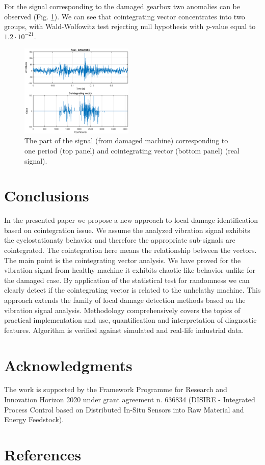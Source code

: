 \documentclass[preprint]{elsarticle}
\begin{document}
For the signal corresponding to the damaged gearbox two anomalies can be observed (Fig. \ref{fig:real_vector_damaged}). We can see that cointegrating vector concentrates into two groups, with Wald-Wolfowitz test rejecting null hypothesis with \emph{p}-value equal to $1.2 \cdot 10^{-21}$. 

\begin{figure}[ht!]
\centering
\includegraphics[width=0.48\textwidth]{wykresy/real_vector_damaged.eps}
\caption{The part of the signal (from damaged machine) corresponding to one  period (top panel) and cointegrating vector (bottom panel) (real signal).}
\label{fig:real_vector_damaged}
\end{figure}


\section{Conclusions}
In the presented paper we propose a new approach to local damage identification based on cointegration issue. We assume the analyzed vibration signal exhibits the cyclostationaty behavior and therefore the appropriate sub-signals are cointegrated. The cointegration here means the relationship between the vectors. The main point is the cointegrating vector analysis. We have proved for the vibration signal from healthy machine it exhibits chaotic-like behavior unlike for the damaged case. By application of the statistical test for randomness we can clearly detect if the cointegrating vector is related to the unhelathy machine. This approach extends the family of local damage detection methods based on the vibration signal analysis.  Methodology comprehensively covers the topics of practical implementation and use, quantification and interpretation of diagnostic features. Algorithm is verified against simulated and real-life industrial data. 

\section*{Acknowledgments}

The work is supported by the Framework Programme for Research and Innovation Horizon 2020 under grant agreement n. 636834 (DISIRE - Integrated Process Control based on Distributed In-Situ Sensors into Raw Material and Energy Feedstock).


\section*{References}


\end{document}
